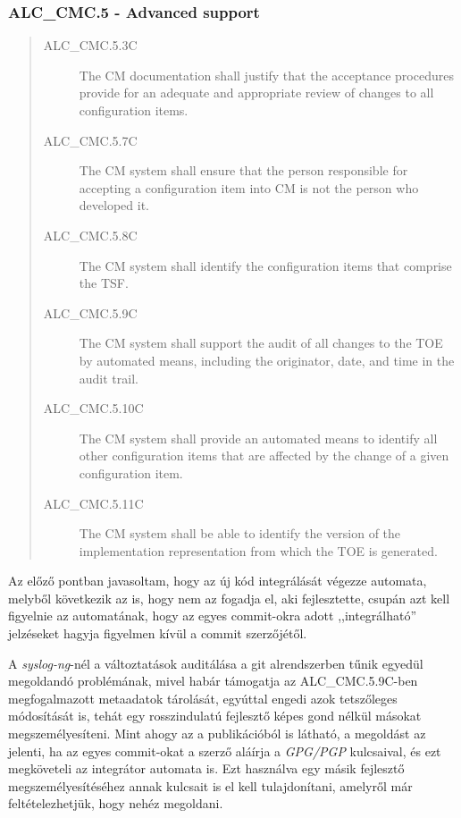 \subsubsection{ALC\_CMC.5 - Advanced support}
\begin{quote}
    \begin{description}
        \item[ALC\_CMC.5.3C]{The CM documentation shall justify that the acceptance procedures
            provide for an adequate and appropriate review of changes to all configuration items.}
        \item[ALC\_CMC.5.7C]{The CM system shall ensure that the person responsible for accepting a
            configuration item into CM is not the person who developed it.}
        \item[ALC\_CMC.5.8C]{The CM system shall identify the configuration items that comprise the
            TSF.}
        \item[ALC\_CMC.5.9C]{The CM system shall support the audit of all changes to the TOE by
            automated means, including the originator, date, and time in the audit trail.}
        \item[ALC\_CMC.5.10C]{The CM system shall provide an automated means to identify all other
            configuration items that are affected by the change of a given configuration item.}
        \item[ALC\_CMC.5.11C]{The CM system shall be able to identify the version of the
            implementation representation from which the TOE is generated.}
    \end{description}
\end{quote}

Az előző pontban javasoltam, hogy az új kód integrálását végezze automata, melyből következik az is,
hogy nem az fogadja el, aki fejlesztette, csupán azt kell figyelnie az automatának, hogy az egyes
commit-okra adott ,,integrálható'' jelzéseket hagyja figyelmen kívül a commit szerzőjétől.

A \emph{syslog-ng}-nél a változtatások auditálása a git alrendszerben tűnik egyedül megoldandó
problémának, mivel habár támogatja az ALC\_CMC.5.9C-ben megfogalmazott metaadatok tárolását,
egyúttal engedi azok tetszőleges módosítását is, tehát egy rosszindulatú fejlesztő képes gond nélkül
másokat megszemélyesíteni. \cite{gerwitz2012agithorrorstory} Mint ahogy az a publikációból is
látható, a megoldást az jelenti, ha az egyes commit-okat a szerző aláírja a \emph{GPG/PGP}
kulcsaival, és ezt megköveteli az integrátor automata is. Ezt használva egy másik fejlesztő
megszemélyesítéséhez annak kulcsait is el kell tulajdonítani, amelyről már feltételezhetjük, hogy
nehéz megoldani.

